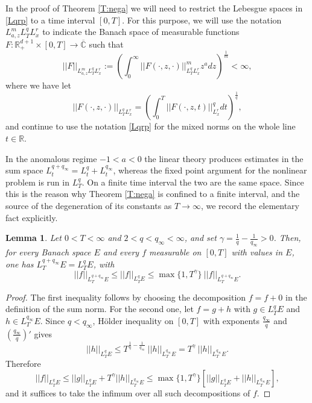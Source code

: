 \documentclass[11pt,letter]{amsart}
\def \RN {\mathbb{R}_+^{d+1}}
\def \R {\mathbb{R}}
\numberwithin{equation}{section}
\newcommand{\C}{\mathbb{C}}
\newtheorem{lemma}[theorem]{Lemma}
\numberwithin{equation}{section}
\begin{document}
In the proof of Theorem \ref{T:nega} we will need to restrict the Lebesgue spaces in \eqref{Lqrp} to a time interval $[0,T]$. For this purpose, we will use the notation $L^m_{a,z} L^q_T L^r_x$ to indicate the Banach space of measurable functions $F:\RN\times [0,T]\to \overline{\C}$ such that
\begin{equation}\label{LmixT}
||F||_{L^m_{a,z} L^q_T L^r_x} :=  \left(\int_0^\infty ||F(\cdot,z,\cdot)||^m_{L^q_T L^r_x} z^a dz\right)^{\frac 1m} < \infty,
\end{equation}
where we have let 
\[
||F(\cdot,z,\cdot)||_{L^q_T L^r_x} = \left(\int_0^T ||F(\cdot,z,t)||^q_{L^r_x} dt\right)^{\frac 1q},
\]
and continue to use the notation \eqref{Lqrp} for the mixed norms on the whole line $t\in \R$.

In the anomalous regime $-1<a<0$ the linear theory produces estimates in the sum space $L^{q+q_\infty}_t = L^q_t + L^{q_\infty}_t$, whereas the fixed point argument for the nonlinear problem is run in $L^q_T$. On a finite time interval the two are the same space. Since this is the reason why Theorem \ref{T:nega} is confined to a finite interval, and the source of the degeneration of its constants as $T\to \infty$, we record the elementary fact explicitly.

\begin{lemma}\label{L:sumT}
Let $0<T<\infty$ and $2<q<q_\infty<\infty$, and set $\gamma = \frac 1q - \frac 1{q_\infty}>0$. Then, for every Banach space $E$ and every $f$ measurable on $[0,T]$ with values in $E$, one has $L^{q+q_\infty}_T E = L^q_T E$, with
\begin{equation}\label{sumT}
||f||_{L^{q+q_\infty}_T E} \le ||f||_{L^{q}_T E} \le \max\{1,T^{\gamma}\}\ ||f||_{L^{q+q_\infty}_T E}.
\end{equation}
\end{lemma}

\begin{proof}
The first inequality follows by choosing the decomposition $f = f + 0$ in the definition of the sum norm. For the second one, let $f = g+h$ with $g\in L^q_T E$ and $h\in L^{q_\infty}_T E$. Since $q<q_\infty$, H\"older inequality on $[0,T]$ with exponents $\frac{q_\infty}{q}$ and $\left(\frac{q_\infty}{q}\right)'$ gives
\[
||h||_{L^q_T E} \le T^{\frac 1q - \frac 1{q_\infty}}\ ||h||_{L^{q_\infty}_T E} = T^{\gamma}\ ||h||_{L^{q_\infty}_T E}.
\]
Therefore
\[
||f||_{L^q_T E} \le ||g||_{L^q_T E} + T^{\gamma} ||h||_{L^{q_\infty}_T E} \le \max\{1,T^{\gamma}\}\left[||g||_{L^q_T E} + ||h||_{L^{q_\infty}_T E}\right],
\]
and it suffices to take the infimum over all such decompositions of $f$.
\end{proof}
\end{document}

